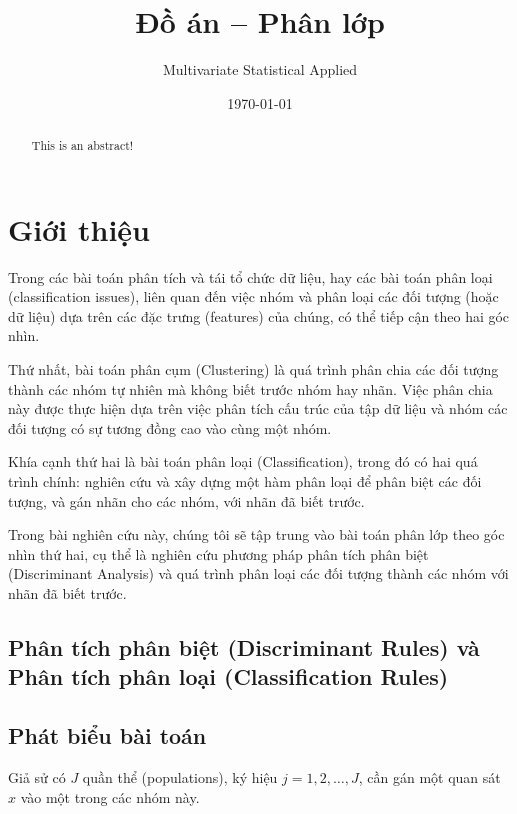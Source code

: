 \documentclass[
  a4paper,
]{article}
\title{Đồ án -- Phân lớp}
\subtitle{Multivariate Statistical Applied}
\author{}
\date{\today}
\begin{document}
\maketitle
\begin{abstract}
This is an abstract!
\end{abstract}

\pagebreak
\tableofcontents 
\pagebreak

\section{Giới thiệu}\label{giux1edbi-thiux1ec7u}

Trong các bài toán phân tích và tái tổ chức dữ liệu, hay các bài toán
phân loại (classification issues), liên quan đến việc nhóm và phân loại
các đối tượng (hoặc dữ liệu) dựa trên các đặc trưng (features) của
chúng, có thể tiếp cận theo hai góc nhìn.

Thứ nhất, bài toán phân cụm (Clustering) là quá trình phân chia các đối
tượng thành các nhóm tự nhiên mà không biết trước nhóm hay nhãn. Việc
phân chia này được thực hiện dựa trên việc phân tích cấu trúc của tập dữ
liệu và nhóm các đối tượng có sự tương đồng cao vào cùng một nhóm.

Khía cạnh thứ hai là bài toán phân loại (Classification), trong đó có
hai quá trình chính: nghiên cứu và xây dựng một hàm phân loại để phân
biệt các đối tượng, và gán nhãn cho các nhóm, với nhãn đã biết trước.

Trong bài nghiên cứu này, chúng tôi sẽ tập trung vào bài toán phân lớp
theo góc nhìn thứ hai, cụ thể là nghiên cứu phương pháp phân tích phân
biệt (Discriminant Analysis) và quá trình phân loại các đối tượng thành
các nhóm với nhãn đã biết trước.

\subsection{Phân tích phân biệt (Discriminant Rules) và Phân tích phân
loại (Classification
Rules)}\label{phuxe2n-tuxedch-phuxe2n-biux1ec7t-discriminant-rules-vuxe0-phuxe2n-tuxedch-phuxe2n-loux1ea1i-classification-rules}

\subsection{Phát biểu bài toán}\label{phuxe1t-biux1ec3u-buxe0i-touxe1n}

Giả sử có \(J\) quần thể (populations), ký hiệu \(j = 1, 2, \dots, J\),
cần gán một quan sát \(x\) vào một trong các nhóm này.
\end{document}
